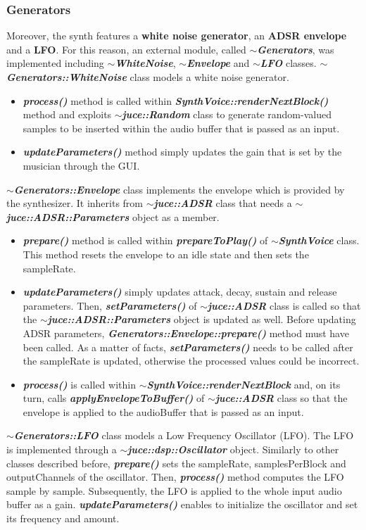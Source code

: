 \documentclass{article}
\begin{document}
\subsubsection{Generators}
Moreover, the synth features a \textbf{white noise generator}, an \textbf{ADSR envelope} and a \textbf{LFO}. For this reason, an external module, called \textbf{\textit{$\sim$Generators}}, was implemented including \textbf{\textit{$\sim$WhiteNoise}}, \textbf{\textit{$\sim$Envelope}} and \textbf{\textit{$\sim$LFO}} classes.
\textbf{\textit{$\sim$Generators::WhiteNoise}} class models a white noise generator. 
\begin{itemize}
    \item \textbf{\textit{process()}} method is called within \textbf{\textit{SynthVoice::renderNextBlock()}} method and exploits \textbf{\textit{$\sim$juce::Random}} class to generate random-valued samples to be inserted within the audio buffer that is passed as an input.
    \item \textbf{\textit{updateParameters()}} method simply updates the gain that is set by the musician through the GUI.
\end{itemize}
\textbf{\textit{$\sim$Generators::Envelope}} class implements the envelope which is provided by the synthesizer. It inherits from \textbf{\textit{$\sim$juce::ADSR}} class that needs a \textbf{\textit{$\sim$juce::ADSR::Parameters}} object as a member. 
\begin{itemize}
    \item \textbf{\textit{prepare()}} method is called within \textbf{\textit{prepareToPlay()}} of \textbf{\textit{$\sim$SynthVoice}} class. This method resets the envelope to an idle state and then sets the sampleRate.
    \item \textbf{\textit{updateParameters()}} simply updates attack, decay, sustain and release parameters. Then, \textbf{\textit{setParameters()}} of \textbf{\textit{$\sim$juce::ADSR}} class is called so that the \textbf{\textit{$\sim$juce::ADSR::Parameters}} object is updated as well. Before updating ADSR parameters, \textbf{\textit{Generators::Envelope::prepare()}} method must have been called. As a matter of facts, \textbf{\textit{setParameters()}} needs to be called after the sampleRate is updated, otherwise the processed values could be incorrect.
    \item \textbf{\textit{process()}} is called within \textbf{\textit{$\sim$SynthVoice::renderNextBlock}} and, on its turn, calls \textbf{\textit{applyEnvelopeToBuffer()}} of \textbf{\textit{$\sim$juce::ADSR}} class so that the envelope is applied to the audioBuffer that is passed as an input.
\end{itemize}
\textbf{\textit{$\sim$Generators::LFO}} class models a Low Frequency Oscillator (LFO). The LFO is implemented through a \textbf{\textit{$\sim$juce::dsp::Oscillator}} object. Similarly to other classes described before, \textbf{\textit{prepare()}} sets the sampleRate, samplesPerBlock and outputChannels of the oscillator. Then, \textbf{\textit{process()}} method computes the LFO sample by sample. Subsequently, the LFO is applied to the whole input audio buffer as a gain. \textbf{\textit{updateParameters()}} enables to initialize the oscillator and set its frequency and amount.
\end{document}
